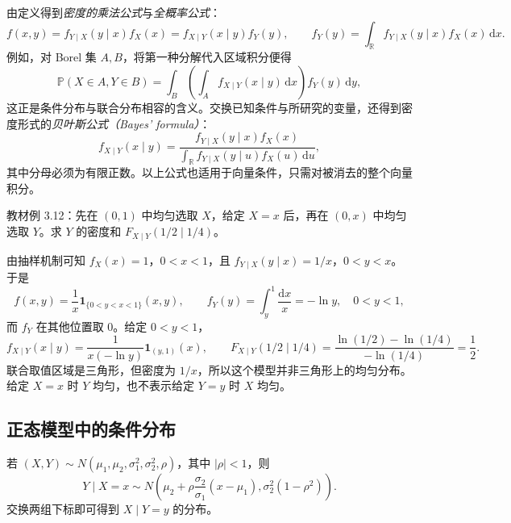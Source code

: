 由定义得到\emph{密度的乘法公式}与\emph{全概率公式}：
\begin{equation}
  f(x,y)=f_{Y\mid X}(y\mid x)f_X(x)
        =f_{X\mid Y}(x\mid y)f_Y(y),\qquad
  f_Y(y)=\int_{\mathbb R}f_{Y\mid X}(y\mid x)f_X(x)\,\mathrm dx.
  \label{eq:study-ch3-density-product-total}
\end{equation}
例如，对 Borel 集 $A,B$，将第一种分解代入区域积分便得
\[
  \mathbb P(X\in A,Y\in B)
  =\int_B\left(\int_A f_{X\mid Y}(x\mid y)\,\mathrm dx\right)f_Y(y)\,\mathrm dy,
\]
这正是条件分布与联合分布相容的含义。交换已知条件与所研究的变量，还得到密度形式的\emph{贝叶斯公式（Bayes' formula）}：
\begin{equation}
  f_{X\mid Y}(x\mid y)
  =\frac{f_{Y\mid X}(y\mid x)f_X(x)}
    {\displaystyle\int_{\mathbb R}f_{Y\mid X}(y\mid u)f_X(u)\,\mathrm du},
  \label{eq:study-ch3-density-bayes}
\end{equation}
其中分母必须为有限正数。以上公式也适用于向量条件，只需对被消去的整个向量积分。

\begin{example}
\label{ex:study-ch3-two-stage-uniform}
教材例 3.12：先在 $(0,1)$ 中均匀选取 $X$，给定 $X=x$ 后，再在 $(0,x)$ 中均匀选取 $Y$。求 $Y$ 的密度和 $F_{X\mid Y}(1/2\mid1/4)$。
\end{example}

\begin{solve}
由抽样机制可知 $f_X(x)=1$，$0<x<1$，且 $f_{Y\mid X}(y\mid x)=1/x$，$0<y<x$。于是
\[
  f(x,y)=\frac1x\boldsymbol 1_{\{0<y<x<1\}}(x,y),\qquad
  f_Y(y)=\int_y^1\frac{\mathrm dx}{x}
       =-\ln y,\quad0<y<1,
\]
而 $f_Y$ 在其他位置取 $0$。给定 $0<y<1$，
\[
  f_{X\mid Y}(x\mid y)=\frac1{x(-\ln y)}\boldsymbol 1_{(y,1)}(x),
  \qquad
  F_{X\mid Y}(1/2\mid1/4)
  =\frac{\ln(1/2)-\ln(1/4)}{-\ln(1/4)}=\frac12.
\]
联合取值区域是三角形，但密度为 $1/x$，所以这个模型并非三角形上的均匀分布。给定 $X=x$ 时 $Y$ 均匀，也不表示给定 $Y=y$ 时 $X$ 均匀。
\end{solve}

\subsection{正态模型中的条件分布}

\begin{proposition}
\label{prop:study-ch3-normal-conditional}
若 $(X,Y)\sim N(\mu_1,\mu_2,\sigma_1^2,\sigma_2^2,\rho)$，其中 $|\rho|<1$，则
\begin{equation}
  Y\mid X=x\sim N\!\left(
    \mu_2+\rho\frac{\sigma_2}{\sigma_1}(x-\mu_1),
    \sigma_2^2(1-\rho^2)\right).
  \label{eq:study-ch3-normal-conditional}
\end{equation}
交换两组下标即可得到 $X\mid Y=y$ 的分布。
\end{proposition}

